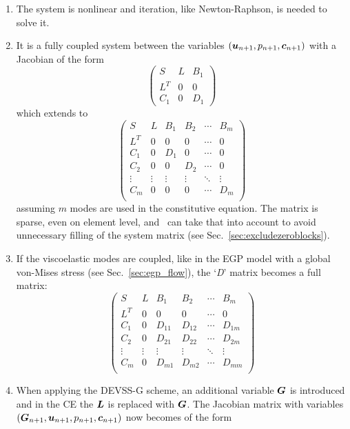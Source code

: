 \begin{enumerate}
\item The system is nonlinear and iteration, like Newton-Raphson, is needed to solve it.
\item It is a fully coupled system between the variables $(\boldsymbol{u}_{n+1},p_{n+1},\boldsymbol{c}_{n+1})$ with a Jacobian of the form
\[
   \begin{pmatrix}
     S & L & B_1 \\
     L^T & 0 & 0 \\
     C_1 & 0 & D_1
    \end{pmatrix}
\]
which extends to
\[
   \begin{pmatrix}
     S & L & B_1 & B_2 & \cdots & B_m \\
     L^T & 0 & 0 & 0 & \cdots & 0 \\
     C_1 & 0 & D_1 & 0 & \cdots & 0 \\
     C_2 & 0 & 0 & D_2 & \cdots & 0 \\
      \vdots  & \vdots & \vdots & \vdots & \ddots & \vdots \\
     C_ m& 0 & 0 & 0& \cdots & D_m \\
    \end{pmatrix}
\]
assuming $m$ modes are used in the constitutive equation.
The matrix is sparse, even on element level, and \tfem\ can take that into account to avoid unnecessary filling of the system matrix (see Sec.~\ref{sec:excludezeroblocks}).
\item If the viscoelastic modes are coupled, like in the EGP model with a global von-Mises stress (see Sec.~\ref{sec:egp_flow}), the `\textit{D}' matrix becomes a full matrix:
\begin{equation}
    \begin{pmatrix}
     S & L & B_1 & B_2 & \cdots & B_m \\
     L^T & 0 & 0 & 0 & \cdots & 0 \\
     C_1 & 0 & D_{11} & D_{12} & \cdots & D_{1m} \\
     C_2 & 0 & D_{21} & D_{22} & \cdots & D_{2m} \\
      \vdots  & \vdots & \vdots & \vdots & \ddots & \vdots \\
     C_ m& 0 & D_{m1} & D_{m2}& \cdots & D_{mm} \\
    \end{pmatrix}\label{eq:fullDmatrix}
\end{equation}
\item When applying the DEVSS-G scheme, an additional variable $\boldsymbol{G}$ is introduced and in the CE the $\boldsymbol{L}$ is replaced with $\boldsymbol{G}$. The Jacobian matrix with variables $(\boldsymbol{G}_{n+1},\boldsymbol{u}_{n+1},p_{n+1},\boldsymbol{c}_{n+1})$ now becomes of the form

\end{enumerate}
